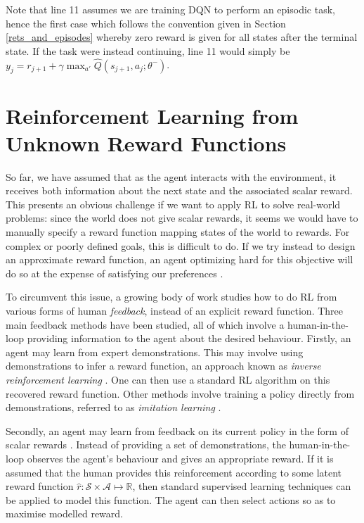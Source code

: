 \documentclass[11pt, a4paper, bibliography=totoc]{report}
\newcommand{\reals}{\mathbb{R}}
\begin{document}
Note that line 11 assumes we are training DQN to perform an episodic task, hence the first case which follows the convention given in Section \ref{rets_and_episodes} whereby zero reward is given for all states after the terminal state. If the task were instead continuing, line 11 would simply be $ y_j = r_{j+1} + \gamma \max_{a'} \hat{Q}(s_{j+1}, a_j ; \theta^- ) $.

\section{Reinforcement Learning from Unknown Reward Functions}
So far, we have assumed that as the agent interacts with the environment, it receives both information about the next state and the associated scalar reward. This presents an obvious challenge if we want to apply RL to solve real-world problems: since the world does not give scalar rewards, it seems we would have to manually specify a reward function mapping states of the world to rewards. For complex or poorly defined goals, this is difficult to do. If we try instead to design an approximate reward function, an agent optimizing hard for this objective will do so at the expense of satisfying our preferences \cite[p.~1]{Christiano2017}.

To circumvent this issue, a growing body of work studies how to do RL from various forms of human \textit{feedback}, instead of an explicit reward function. Three main feedback methods have been studied, all of which involve a human-in-the-loop providing information to the agent about the desired behaviour. Firstly, an agent may learn from expert demonstrations. This may involve using demonstrations to infer a reward function, an approach known as \textit{inverse reinforcement learning} \cite{Ng2000, Ziebart2008}. One can then use a standard RL algorithm on this recovered reward function. Other methods involve training a policy directly from demonstrations, referred to as \textit{imitation learning} \cite{Ho2016, Hester2017}.

Secondly, an agent may learn from feedback on its current policy in the form of scalar rewards \cite{Knox2009, Warnell2017}. Instead of providing a set of demonstrations, the human-in-the-loop observes the agent's behaviour and gives an appropriate reward. If it is assumed that the human provides this reinforcement according to some latent reward function $ \hat{r} : \mathcal{S} \times \mathcal{A} \mapsto \reals $, then standard supervised learning techniques can be applied to model this function. The agent can then select actions so as to maximise modelled reward.
\end{document}
